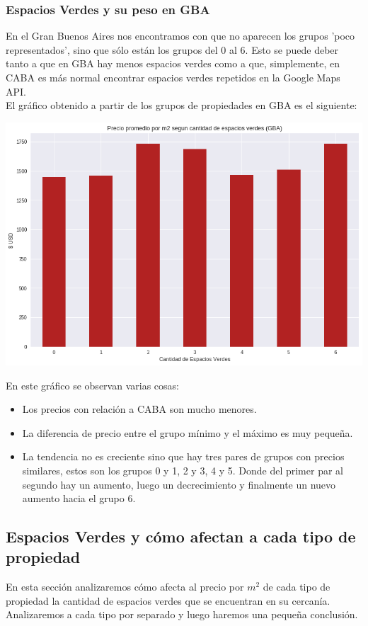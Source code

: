 \documentclass[a4paper, 10pt]{article}
\newcommand\tab[1][0.5cm]{\hspace*{#1}}
\begin{document}
			\subsubsection{Espacios Verdes y su peso en GBA}
				En el Gran Buenos Aires nos encontramos con que no aparecen los grupos 'poco representados', sino que sólo están
				los grupos del 0 al 6. Esto se puede deber tanto a que en GBA hay menos espacios verdes como a que, simplemente,
				en CABA es más normal encontrar espacios verdes repetidos en la Google Maps API. \\
				\tab El gráfico obtenido a partir de los grupos de propiedades en GBA es el siguiente:
				\begin{center}
					\includegraphics[width=\textwidth]{images/parksM2-GBA}
				\end{center}
				\tab En este gráfico se observan varias cosas:
				\begin{itemize}
					\item Los precios con relación a CABA son mucho menores.
					\item La diferencia de precio entre el grupo mínimo y el máximo es muy pequeña.
					\item La tendencia no es creciente sino que hay tres pares de grupos con precios similares, estos son los
					grupos 0 y 1, 2 y 3, 4 y 5. Donde del primer par al segundo hay un aumento, luego un decrecimiento y finalmente
					un nuevo aumento hacia el grupo 6.
				\end{itemize}
		\subsection{Espacios Verdes y cómo afectan a cada tipo de propiedad}
			En esta sección analizaremos cómo afecta al precio por $m^2$ de cada tipo de propiedad la cantidad de espacios
			verdes que se encuentran en su cercanía. Analizaremos a cada tipo por separado y luego haremos una pequeña conclusión.
\end{document}
